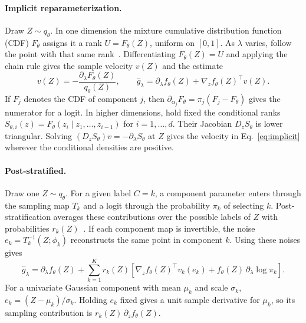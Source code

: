 \paragraph*{Implicit reparameterization.}
Draw $Z\sim q_\theta$. In one dimension the mixture cumulative distribution
function (CDF) $F_\theta$ assigns it a rank $U=F_\theta(Z)$, uniform on
$[0,1]$. As $\lambda$ varies, follow the point with that same
rank~\citep{figurnov2018implicit}. Differentiating $F_\theta(Z)=U$ and
applying the chain rule gives the sample velocity $v(Z)$ and the estimate
\begin{equation}
 v(Z)=-\frac{\partial_\lambda F_\theta(Z)}{q_\theta(Z)},\qquad
 \widehat g_\lambda
 = \partial_\lambda f_\theta(Z)+\nabla_z f_\theta(Z)^\top v(Z).
 \label{eq:implicit}
\end{equation}
If $F_j$ denotes the CDF of component $j$, then
$\partial_{\alpha_j}F_\theta=\pi_j(F_j-F_\theta)$ gives the numerator
for a logit. In higher dimensions, hold fixed the conditional ranks
$S_{\theta,i}(z)=F_\theta(z_i\mid z_1,\ldots,z_{i-1})$ for $i=1,\ldots,d$.
Their Jacobian $D_z S_\theta$ is lower triangular. Solving
$(D_z S_\theta)v=-\partial_\lambda S_\theta$ at $Z$ gives the velocity in
Eq.~\eqref{eq:implicit} wherever the conditional densities are positive.

\paragraph*{Post-stratified.}
Draw one $Z\sim q_\theta$. For a given label $C=k$, a component parameter
enters through the sampling map $T_k$ and a logit through the probability
$\pi_k$ of selecting $k$. Post-stratification averages these contributions
over the possible labels of $Z$ with probabilities $r_k(Z)$~\citep{burroni2026mixture}.
If each component map is invertible, the noise $e_k=T_k^{-1}(Z;\phi_k)$
reconstructs the same point in component $k$. Using these noises gives
\begin{equation}
 \widehat g_\lambda
 = \partial_\lambda f_\theta(Z)
   + \sum_{k=1}^K r_k(Z)\left[
       \nabla_z f_\theta(Z)^\top v_k(e_k)
       + f_\theta(Z)\,\partial_\lambda\log\pi_k\right].
 \label{eq:poststratified}
\end{equation}
For a univariate Gaussian component with mean $\mu_k$ and scale $\sigma_k$,
$e_k=(Z-\mu_k)/\sigma_k$. Holding $e_k$ fixed gives a unit sample derivative
for $\mu_k$, so its sampling contribution is $r_k(Z)\,\partial_z f_\theta(Z)$.
